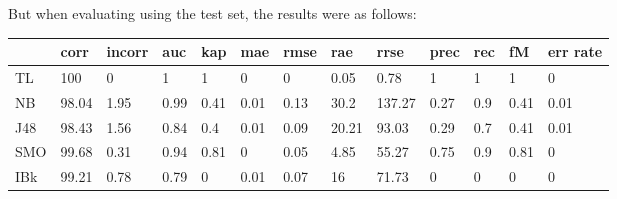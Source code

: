 \documentclass[a4paper,12pt, english]{article}
\begin{document}
But when evaluating using the test set, the results were as follows:
\begin{small}
\begin{center}
    \begin{tabular}{ | l | l | l | l | l | l | l | l | l | l | l | l | l |}
    \hline
      	& corr & incorr  & auc & kap & mae & rmse & rae & rrse & prec & rec & fM & err rate\\ \hline
      	TL & 100 & 0 & 1 & 1 & 0 & 0 & 0.05 & 0.78 & 1 & 1 & 1 & 0\\ \hline
	NB & 98.04 & 1.95 & 0.99 & 0.41 & 0.01 & 0.13 & 30.2 & 137.27 & 0.27 & 0.9 & 0.41 & 0.01\\ \hline
	J48 & 98.43 & 1.56 & 0.84 & 0.4 & 0.01 & 0.09 & 20.21 & 93.03 & 0.29 & 0.7 & 0.41 & 0.01\\ \hline
	SMO & 99.68 & 0.31 & 0.94 & 0.81 & 0 & 0.05 & 4.85 & 55.27 & 0.75 & 0.9 & 0.81 & 0\\ \hline
	IBk & 99.21 & 0.78 & 0.79 & 0 & 0.01 & 0.07 & 16 & 71.73 & 0 & 0 & 0 & 0\\ \hline  
    \end{tabular}       
\end{center}
\end{small}

\newpage
\end{document}
